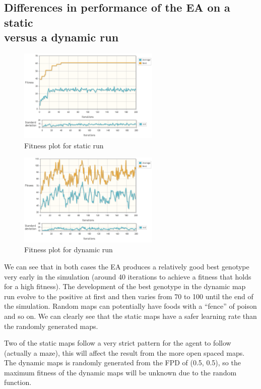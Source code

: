 \newpage %

\subsection{Differences in performance of the EA on a static \\versus a dynamic run}
\begin{figure}[h]
  \centering
    \includegraphics[width=0.6\textwidth]{img/Flatland_static}
    \caption{Fitness plot for static run}
\end{figure}

\begin{figure}[h]
  \centering
    \includegraphics[width=0.6\textwidth]{img/Flatland_dynamic}
    \caption{Fitness plot for dynamic run}
\end{figure}

We can see that in both cases the EA produces a relatively good best genotype very early in the simulation (around 40 iterations to achieve a fitness that holds for a high fitness). The development of the best genotype in the dynamic map run evolve to the positive at first and then varies from 70 to 100 until the end of the simulation. Random maps can potentially have foods with a ``fence'' of poison and so on. We can clearly see that the static maps have a safer learning rate than the randomly generated maps.


Two of the static maps follow a very strict pattern for the agent to follow (actually a maze), this will affect the result from the more open spaced maps. The dynamic maps is randomly generated from the FPD of (0.5, 0.5), so the maximum fitness of the dynamic maps will be unknown due to the random function.

